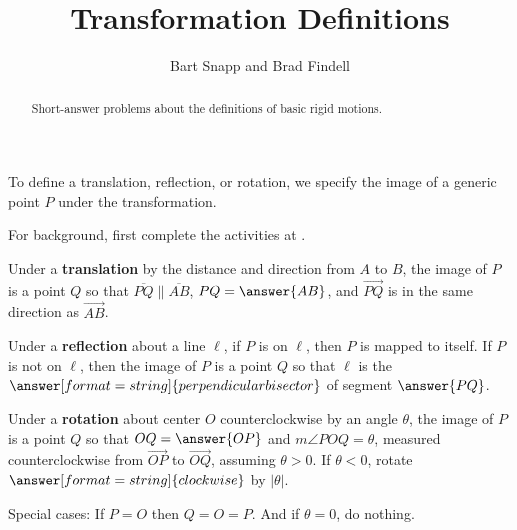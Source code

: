 \documentclass[nooutcomes]{ximera}
\title{Transformation Definitions}
\author{Bart Snapp and Brad Findell}
\begin{document}
\begin{abstract}
Short-answer problems about the definitions of basic rigid motions.
\end{abstract}
\maketitle

To define a translation, reflection, or rotation, we specify the image of a generic point $P$ under the transformation.  

For background, first complete the activities at .

\begin{question}
Under a \textbf{translation} by the distance and direction from $A$ to $B$, the image of $P$ is a point $Q$ so that $\overline{PQ} \parallel \overline{AB}$, $PQ=\answer{AB}$, and $\overrightarrow{PQ}$ is in the same direction as $\overrightarrow{AB}$.  
\end{question}

\begin{question}
Under a \textbf{reflection} about a line $\ell$, if $P$ is on $\ell$, then $P$ is mapped to itself.  If $P$ is not on $\ell$, then the image of $P$ is a point $Q$ so that $\ell$ is the 
$\answer[format=string]{perpendicular bisector}$ of segment $\answer{PQ}$.  
\end{question}

\begin{question}
Under a \textbf{rotation} about center $O$ counterclockwise by an angle $\theta$, the image of $P$ is 
a point $Q$ so that $OQ = \answer{OP}$ and $m\angle POQ = \theta$, measured counterclockwise 
from $\overrightarrow{OP}$ to $\overrightarrow{OQ}$, assuming $\theta>0$.  If $\theta<0$, rotate $\answer[format=string]{clockwise}$ by $|\theta|$.  

Special cases:  If $P = O$ then $Q=O=P$.  And if $\theta=0$, do nothing. 
\end{question}

\end{document}
